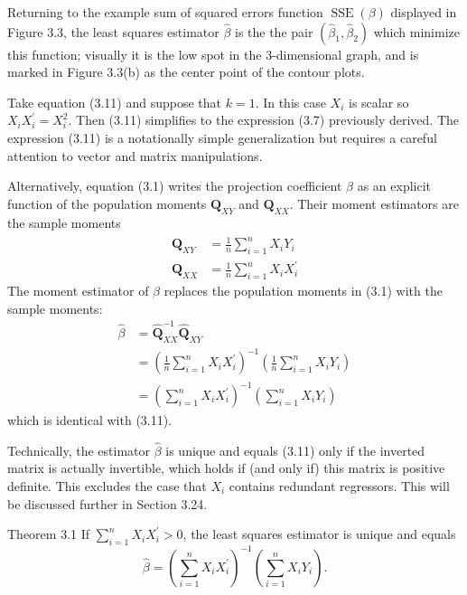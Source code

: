 \documentclass[10pt]{article}
\begin{document}
Returning to the example sum of squared errors function $\operatorname{SSE}(\beta)$ displayed in Figure $3.3$, the least squares estimator $\widehat{\beta}$ is the the pair $\left(\widehat{\beta}_{1}, \widehat{\beta}_{2}\right)$ which minimize this function; visually it is the low spot in the 3-dimensional graph, and is marked in Figure 3.3(b) as the center point of the contour plots.

Take equation (3.11) and suppose that $k=1$. In this case $X_{i}$ is scalar so $X_{i} X_{i}^{\prime}=X_{i}^{2}$. Then (3.11) simplifies to the expression (3.7) previously derived. The expression (3.11) is a notationally simple generalization but requires a careful attention to vector and matrix manipulations.

Alternatively, equation (3.1) writes the projection coefficient $\beta$ as an explicit function of the population moments $\boldsymbol{Q}_{X Y}$ and $\boldsymbol{Q}_{X X}$. Their moment estimators are the sample moments
$$
\begin{aligned}
\widehat{\boldsymbol{Q}}_{X Y} &=\frac{1}{n} \sum_{i=1}^{n} X_{i} Y_{i} \\
\widehat{\boldsymbol{Q}}_{X X} &=\frac{1}{n} \sum_{i=1}^{n} X_{i} X_{i}^{\prime}
\end{aligned}
$$
The moment estimator of $\beta$ replaces the population moments in (3.1) with the sample moments:
$$
\begin{aligned}
\widehat{\beta} &=\widehat{\boldsymbol{Q}}_{X X}^{-1} \widehat{\boldsymbol{Q}}_{X Y} \\
&=\left(\frac{1}{n} \sum_{i=1}^{n} X_{i} X_{i}^{\prime}\right)^{-1}\left(\frac{1}{n} \sum_{i=1}^{n} X_{i} Y_{i}\right) \\
&=\left(\sum_{i=1}^{n} X_{i} X_{i}^{\prime}\right)^{-1}\left(\sum_{i=1}^{n} X_{i} Y_{i}\right)
\end{aligned}
$$
which is identical with (3.11).

Technically, the estimator $\widehat{\beta}$ is unique and equals (3.11) only if the inverted matrix is actually invertible, which holds if (and only if) this matrix is positive definite. This excludes the case that $X_{i}$ contains redundant regressors. This will be discussed further in Section 3.24.

Theorem 3.1 If $\sum_{i=1}^{n} X_{i} X_{i}^{\prime}>0$, the least squares estimator is unique and equals
$$
\widehat{\beta}=\left(\sum_{i=1}^{n} X_{i} X_{i}^{\prime}\right)^{-1}\left(\sum_{i=1}^{n} X_{i} Y_{i}\right) .
$$
\end{document}
